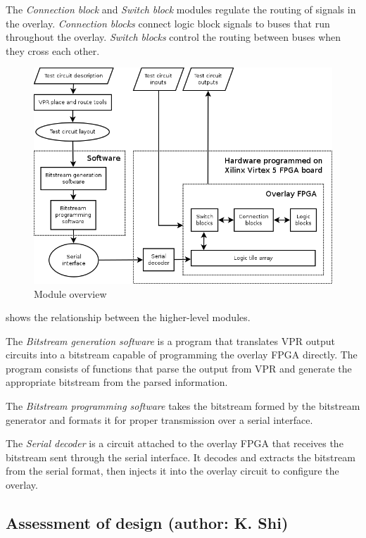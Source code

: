 The \emph{Connection block} and \emph{Switch block} modules regulate the routing of signals in the overlay.
\emph{Connection blocks} connect logic block signals to buses that run throughout the 
overlay.
\emph{Switch blocks} control the routing between buses when they cross each other.

\begin{figure}[!h]
	\centering
	\includegraphics[scale=0.6]{modules.png}
	\caption{Module overview}
	\label{module-diagram}
\end{figure}

 shows the relationship between the higher-level modules.

The \emph{Bitstream generation software} is a program that translates VPR output circuits into a bitstream capable of programming the overlay FPGA directly.
The program consists of functions that parse the output from VPR and generate the 
appropriate bitstream from the parsed information.

The \emph{Bitstream programming software} takes the bitstream formed by the bitstream generator and formats it for proper transmission over a serial interface.

The \emph{Serial decoder} is a circuit attached to the overlay FPGA that receives the 
bitstream sent through the serial interface.
It decodes and extracts the bitstream from the serial format, then injects it into the overlay circuit to configure the overlay.



\subsection{Assessment of design (author: K. Shi)}

